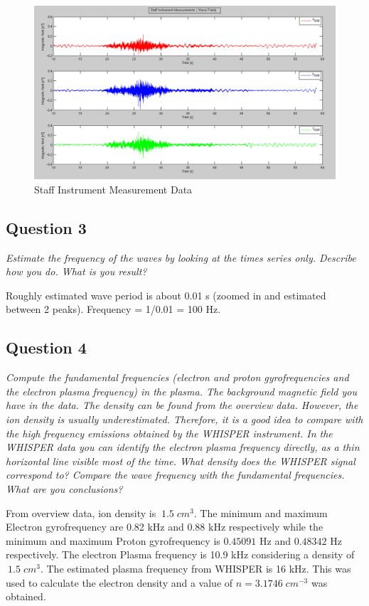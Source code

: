 \documentclass{article}
\begin{document}
\begin{figure}[htb!]
\centering
\includegraphics[width=\textwidth]{Figures/Staff_measurement.png}
\caption{Staff Instrument Measurement Data}
\label{fig:Staff}
\end{figure}

\subsection{Question 3}
\textit{Estimate the frequency of the waves by looking at the times series only. Describe how you do. What is you result?}

Roughly estimated wave period is about 0.01 s (zoomed in and estimated between 2 peaks). Frequency = 1/0.01 = 100 Hz.

\subsection{Question 4}
\textit{Compute the fundamental frequencies (electron and proton gyrofrequencies and the electron plasma frequency) in the plasma. The background magnetic field you have in the data. The density can be found from the overview data. However, the ion density is usually underestimated. Therefore, it is a good idea to compare with the high frequency emissions obtained by the WHISPER instrument. In the WHISPER data you can identify the electron plasma frequency directly, as a thin horizontal line visible most of the time. What density does the WHISPER signal correspond to? Compare the wave frequency with the fundamental frequencies. What are you conclusions?}

From overview data, ion density is $~1.5 \; cm^3$. The minimum and maximum Electron gyrofrequency are 0.82 kHz and 0.88 kHz respectively while the minimum and maximum Proton gyrofrequency is $0.45091$ Hz and $0.48342$ Hz respectively. The electron Plasma frequency is 10.9 kHz considering a density of $~1.5 \; cm^3$. The estimated plasma frequency from WHISPER is 16 kHz. This was used to calculate the electron density and a value of $n= 3.1746 \; cm^{−3}$ was obtained.
\end{document}

